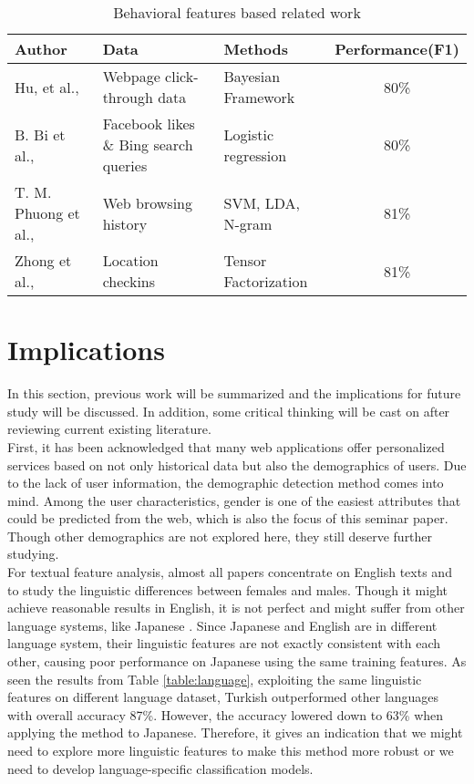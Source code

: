 \documentclass[runningheads]{llncs}
\begin{document}
	\begin{table}
		\caption{Behavioral features based related work }
		\centering
		\begin{tabular}{| l | l | l | c | }
			\hline
			Author  &  Data  & Methods & Performance(F1)\\
			\hline
			Hu, et al.,  \cite{hu2007demographic} & Webpage click-through data
			& Bayesian Framework
			& 80\% \\
			B. Bi et al., \cite{bi2013inferring} & Facebook likes \& Bing search queries & Logistic regression & 80\% \\
			T. M. Phuong et al., \cite{phuong2014gender} & Web browsing history & SVM, LDA, N-gram
			& 81\% \\
			Zhong et al., \cite{zhong2015you} & Location checkins & Tensor Factorization & 81\% \\
			\hline
		\end{tabular}
		\label{table:behavioral_work}
	\end{table}
	\newpage
	\section{Implications}
	
	In this section, previous work will be summarized and the implications for future study will be discussed. In addition, some critical thinking will be cast on after reviewing current existing literature. \\
	
	First, it has been acknowledged that many web applications offer personalized services based on not only historical data but also the demographics of users. Due to the lack of user information, the demographic detection method comes into mind. Among the user characteristics, gender is one of the easiest attributes that could be predicted from the web, which is also the focus of this seminar paper. Though other demographics are not explored here, they still deserve further studying. \\
	
	For textual feature analysis, almost all papers concentrate on English texts and to study the linguistic differences between females and males. Though it might achieve reasonable results in English, it is not perfect and might suffer from other language systems, like Japanese \cite{ciot2013gender}. Since Japanese and English are in different language system, their linguistic features are not exactly consistent with each other, causing poor performance on Japanese using the same training features. As seen the results from Table \ref{table:language}, exploiting the same linguistic features on different language dataset, Turkish outperformed other languages with overall accuracy 87\%. However, the accuracy lowered down to 63\% when applying the method to Japanese. Therefore, it gives an indication that we might need to explore more linguistic features to make this method more robust or we need to develop language-specific classification models. \\
	
\end{document}
